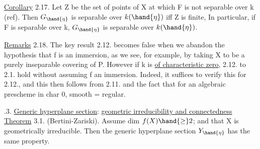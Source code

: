 
\uline{Corollary} 2.17. Let Z be the set of points of X at which F
is not separable over k (ref). Then $G_{\hand{\eta}}$ is separable over $k(\hand{\eta})$ iff
Z is finite, In particular, if F is separable over k, $G_{\hand{\eta}}$ is separable
over $k(\hand{\eta})$.

\uline{Remarks} 2.18. The key result 2.12.  becomes false when we abandon
the hypothesis that f is an immersion, as we see, for example, by
taking X to be a purely inseparable covering of P.  However
  if k is \uline{of characteristic zero}, 2.12. to
2.1. hold without assuming f an immersion. Indeed, it suffices
to verify this for 2.12., and this then follows from 2.11. and the fact
that  for an algebraic prescheme in char 0, smooth = regular.


.3. \uline{Generic hyperplane section}: \uline{geometric irreducibility and connectedness}
\uline{Theorem} 3.1. (Bertini-Zariski). Assume dim $f(X) \hand{\geq} 2$; and that X
is  geometrically irreducible. Then
the generic hyperplane section $Y_{\hand{\eta}}$ has the same property.

